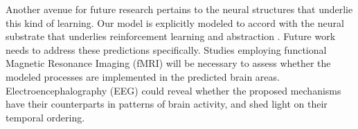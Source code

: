\documentclass[10pt, letterpaper]{article}
\begin{document}
Another avenue for future research pertains to the neural structures that underlie this kind of learning. Our model is explicitly modeled to accord with the neural substrate that underlies reinforcement learning and abstraction \cite{alexander_parallel_1986}. Future work needs to address these predictions specifically. Studies employing functional Magnetic Resonance Imaging (fMRI) will be necessary to assess whether the modeled processes are implemented in the predicted brain areas. Electroencephalography (EEG) could reveal whether the proposed mechanisms have their counterparts in patterns of brain activity, and shed light on their temporal ordering. 



\end{document}
